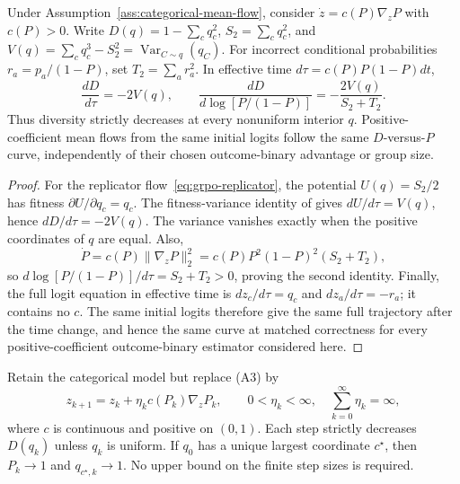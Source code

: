 \begin{proposition}
\enforcehalffinalproseline
\label{prop:pcmd-drift}
Under Assumption~\ref{ass:categorical-mean-flow}, consider
$\dot z=c(P)\nabla_zP$ with $c(P)>0$. Write
$D(q)=1-\sum_cq_c^2$, $S_2=\sum_cq_c^2$, and
$V(q)=\sum_cq_c^3-S_2^2=\operatorname{Var}_{C\sim q}(q_C)$.
For incorrect conditional probabilities $r_a=p_a/(1-P)$, set
$T_2=\sum_ar_a^2$. In effective time $d\tau=c(P)P(1-P)dt$,
\begin{equation}
 \frac{dD}{d\tau}=-2V(q),
 \qquad
 \frac{dD}{d\log[P/(1-P)]}
 =-\frac{2V(q)}{S_2+T_2}.
 \label{eq:pcmd-drift}
\end{equation}
Thus diversity strictly decreases at every nonuniform interior $q$.
Positive-coefficient mean flows from the same initial logits follow the same
$D$-versus-$P$ curve, independently of their chosen outcome-binary advantage or
group size.
\end{proposition}

\begin{proof}
\enforcehalffinalproseline
For the replicator flow~\eqref{eq:grpo-replicator}, the potential
$U(q)=S_2/2$ has fitness $\partial U/\partial q_c=q_c$.
The fitness-variance identity of
\citet[Theorems~1--2]{harper2009informationgeometry} gives
$dU/d\tau=V(q)$, hence $dD/d\tau=-2V(q)$.
The variance vanishes exactly when the
positive coordinates of $q$ are equal. Also,
\[
 \dot P=c(P)\|\nabla_zP\|_2^2
       =c(P)P^2(1-P)^2(S_2+T_2),
\]
so $d\log[P/(1-P)]/d\tau=S_2+T_2>0$, proving the second identity.
Finally, the full logit equation in effective time is
$dz_c/d\tau=q_c$ and $dz_a/d\tau=-r_a$; it contains no $c$.
The same initial logits therefore give the same full trajectory after the
time change, and hence the same curve at matched correctness for every positive-coefficient outcome-binary estimator considered here.
\end{proof}

\begin{theorem}
\enforcehalffinalproseline
\label{thm:finite-expected-steps}
Retain the categorical model but replace (A3) by
\begin{equation}
 z_{k+1}=z_k+\eta_k c(P_k)\nabla_zP_k,
 \qquad 0<\eta_k<\infty,\quad \sum_{k=0}^\infty\eta_k=\infty,
 \label{eq:finite-expected-update}
\end{equation}
where $c$ is continuous and positive on $(0,1)$. Each step strictly decreases
$D(q_k)$ unless $q_k$ is uniform. If $q_0$ has a unique largest coordinate
$c^\star$, then $P_k\to1$ and $q_{c^\star,k}\to1$.
No upper bound on the finite step sizes is required.
\end{theorem}

